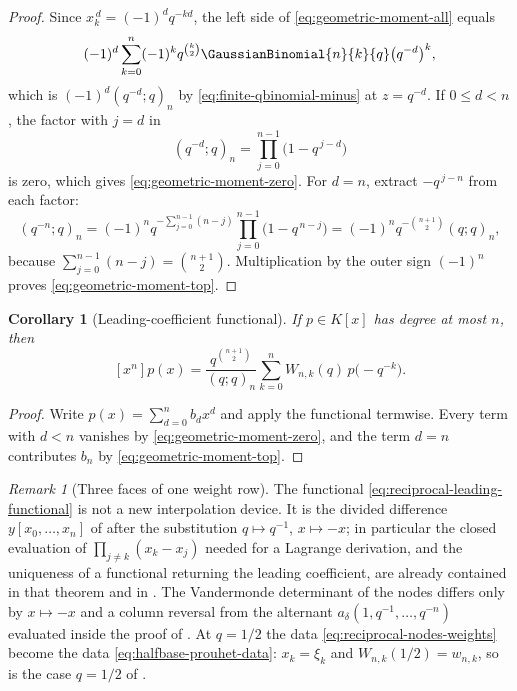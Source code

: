 \documentclass[11pt,a4paper,oneside,openany]{book}
\newtheorem{corollary}[corollary]{Corollary}
\theoremstyle{definition}
\theoremstyle{remark}
\newtheorem{remark}[remark]{Remark}
\begin{document}
\begin{proof}
Since $x_k^{\,d}=(-1)^dq^{-kd}$, the left side of \eqref{eq:geometric-moment-all} equals
\[
 (-1)^d\sum_{k=0}^{n}(-1)^kq^{\binom k2}\GaussianBinomial{n}{k}{q}\bigl(q^{-d}\bigr)^{k},
\]
which is $(-1)^d(q^{-d};q)_n$ by \eqref{eq:finite-qbinomial-minus} at $z=q^{-d}$.  If $0\le d<n$, the factor with $j=d$ in
\[
 (q^{-d};q)_n=\prod_{j=0}^{n-1}\bigl(1-q^{\,j-d}\bigr)
\]
is zero, which gives \eqref{eq:geometric-moment-zero}.  For $d=n$, extract $-q^{\,j-n}$ from each factor:
\[
 (q^{-n};q)_n
 =(-1)^nq^{-\sum_{j=0}^{n-1}(n-j)}\prod_{j=0}^{n-1}\bigl(1-q^{\,n-j}\bigr)
 =(-1)^nq^{-\binom{n+1}{2}}(q;q)_n,
\]
because $\sum_{j=0}^{n-1}(n-j)=\binom{n+1}{2}$.  Multiplication by the outer sign $(-1)^n$ proves \eqref{eq:geometric-moment-top}.
\end{proof}

\begin{corollary}[Leading-coefficient functional]\label{cor:reciprocal-leading-coefficient}
If $p\in K[x]$ has degree at most $n$, then
\begin{equation}\label{eq:reciprocal-leading-functional}
 [x^n]p(x)
 =\frac{q^{\binom{n+1}{2}}}{(q;q)_n}
  \sum_{k=0}^{n}W_{n,k}(q)\,p\bigl(-q^{-k}\bigr).
\end{equation}
\end{corollary}

\begin{proof}
Write $p(x)=\sum_{d=0}^{n}b_dx^d$ and apply the functional termwise.  Every term with $d<n$ vanishes by \eqref{eq:geometric-moment-zero}, and the term $d=n$ contributes $b_n$ by \eqref{eq:geometric-moment-top}.
\end{proof}

\begin{remark}[Three faces of one weight row]\label{rem:reciprocal-weight-faces}
The functional \eqref{eq:reciprocal-leading-functional} is not a new interpolation device.  It is the divided difference $y[x_0,\ldots,x_n]$ of  after the substitution $q\mapsto q^{-1}$, $x\mapsto-x$; in particular the closed evaluation of $\prod_{j\ne k}(x_k-x_j)$ needed for a Lagrange derivation, and the uniqueness of a functional returning the leading coefficient, are already contained in that theorem and in .  The Vandermonde determinant of the nodes differs only by $x\mapsto-x$ and a column reversal from the alternant $a_\delta(1,q^{-1},\ldots,q^{-n})$ evaluated inside the proof of .  At $q=1/2$ the data \eqref{eq:reciprocal-nodes-weights} become the data \eqref{eq:halfbase-prouhet-data}: $x_k=\xi_k$ and $W_{n,k}(1/2)=w_{n,k}$, so  is the case $q=1/2$ of .
\end{remark}
\end{document}
